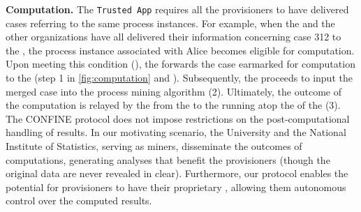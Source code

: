 \noindent\textbf{Computation.} The \texttt{Trusted App} requires all the provisioners to have delivered cases referring to the same process instances. For example, when the  and the other organizations have all delivered their information concerning case 312 to the , the process instance associated with Alice becomes eligible for computation. Upon meeting this condition (), the  forwards the case earmarked for computation to the  (step 1 in \cref{fig:computation} and ). Subsequently, the  proceeds to input the merged case into the process mining algorithm (2). Ultimately, the outcome of the computation is relayed by the  from the  to the  running atop the  of the  (3). The CONFINE protocol does not impose restrictions on the post-computational handling of results. In our motivating scenario, the University and the National Institute of Statistics, serving as miners, disseminate the outcomes of computations, generating analyses that benefit the provisioners (though the original data are never revealed in clear). Furthermore, our protocol enables the potential for provisioners to have their proprietary , allowing them autonomous control over the computed results.

